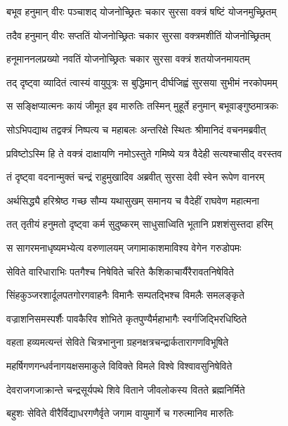 \twolineshloka
{बभूव हनुमान् वीरः पञ्चाशद् योजनोच्छ्रितः}
{चकार सुरसा वक्त्रं षष्टिं योजनमुच्छ्रितम्} %

\twolineshloka
{तदैव हनुमान् वीरः सप्ततिं योजनोच्छ्रितः}
{चकार सुरसा वक्त्रमशीतिं योजनोच्छ्रितम्} %

\twolineshloka
{हनूमाननलप्रख्यो नवतिं योजनोच्छ्रितः}
{चकार सुरसा वक्त्रं शतयोजनमायतम्} %

\twolineshloka
{तद् दृष्ट्वा व्यादितं त्वास्यं वायुपुत्रः स बुद्धिमान्}
{दीर्घजिह्वं सुरसया सुभीमं नरकोपमम्} %

\twolineshloka
{स सङ्क्षिप्यात्मनः कायं जीमूत इव मारुतिः}
{तस्मिन् मुहूर्ते हनुमान् बभूवाङ्गुष्ठमात्रकः} %

\twolineshloka
{सोऽभिपद्याथ तद्वक्त्रं निष्पत्य च महाबलः}
{अन्तरिक्षे स्थितः श्रीमानिदं वचनमब्रवीत्} %

\twolineshloka
{प्रविष्टोऽस्मि हि ते वक्त्रं दाक्षायणि नमोऽस्तुते}
{गमिष्ये यत्र वैदेही सत्यश्चासीद् वरस्तव} %

\twolineshloka
{तं दृष्ट्वा वदनान्मुक्तं चन्द्रं राहुमुखादिव}
{अब्रवीत् सुरसा देवी स्वेन रूपेण वानरम्} %

\twolineshloka
{अर्थसिद्ध्यै हरिश्रेष्ठ गच्छ सौम्य यथासुखम्}
{समानय च वैदेहीं राघवेण महात्मना} %

\twolineshloka
{तत् तृतीयं हनुमतो दृष्ट्वा कर्म सुदुष्करम्}
{साधुसाध्विति भूतानि प्रशशंसुस्तदा हरिम्} %

\twolineshloka
{स सागरमनाधृष्यमभ्येत्य वरुणालयम्}
{जगामाकाशमाविश्य वेगेन गरुडोपमः} %

\twolineshloka
{सेविते वारिधाराभिः पतगैश्च निषेविते}
{चरिते कैशिकाचार्यैरैरावतनिषेविते} %

\twolineshloka
{सिंहकुञ्जरशार्दूलपतगोरगवाहनैः}
{विमानैः सम्पतद्भिश्च विमलैः समलङ्कृते} %

\twolineshloka
{वज्राशनिसमस्पर्शैः पावकैरिव शोभिते}
{कृतपुण्यैर्महाभागैः स्वर्गजिद्भिरधिष्ठिते} %

\twolineshloka
{वहता हव्यमत्यन्तं सेविते चित्रभानुना}
{ग्रहनक्षत्रचन्द्रार्कतारागणविभूषिते} %

\twolineshloka
{महर्षिगणगन्धर्वनागयक्षसमाकुले}
{विविक्ते विमले विश्वे विश्वावसुनिषेविते} %

\twolineshloka
{देवराजगजाक्रान्ते चन्द्रसूर्यपथे शिवे}
{विताने जीवलोकस्य वितते ब्रह्मनिर्मिते} %

\twolineshloka
{बहुशः सेविते वीरैर्विद्याधरगणैर्वृते}
{जगाम वायुमार्गे च गरुत्मानिव मारुतिः} %

